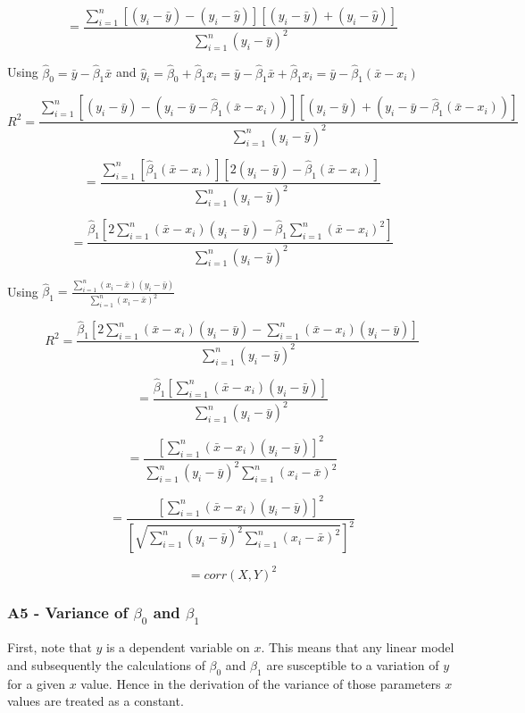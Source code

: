 \documentclass[11pt]{article}
\begin{document}
\[= \frac{ \sum_{i=1}^n [ (y_i - \bar{y}) - (y_i - \hat{y}) ][ (y_i - \bar{y}) + (y_i - \hat{y}) ] }{ \sum_{i=1}^n (y_i - \bar{y})^2 }\]

Using \(\hat{\beta}_0 = \bar{y} - \hat{\beta}_1 \bar{x}\) and
\(\hat{y}_i = \hat{\beta}_0 + \hat{\beta}_1 x_i = \bar{y} - \hat{\beta}_1 \bar{x} + \hat{\beta}_1 x_i = \bar{y} -\hat{\beta}_1(\bar{x} - x_i)\)

\[R^2= \frac{ \sum_{i=1}^n [ (y_i - \bar{y}) - (y_i - \bar{y} -\hat{\beta}_1(\bar{x} - x_i)) ][ (y_i - \bar{y}) + (y_i - \bar{y} -\hat{\beta}_1(\bar{x} - x_i)) ] }{ \sum_{i=1}^n (y_i - \bar{y})^2 }\]

\[= \frac{ \sum_{i=1}^n [ \hat{\beta}_1(\bar{x} - x_i) ][ 2(y_i - \bar{y}) -\hat{\beta}_1(\bar{x} - x_i) ] }{ \sum_{i=1}^n (y_i - \bar{y})^2 }\]

\[= \frac{ \hat{\beta}_1 \left[ 2 \sum_{i=1}^n (\bar{x} - x_i)(y_i - \bar{y}) - \hat{\beta}_1\sum_{i=1}^n (\bar{x} - x_i)^2 \right] }{ \sum_{i=1}^n (y_i - \bar{y})^2 }\]

Using
\(\hat{\beta}_1 = \frac{ \sum_{i=1}^n (x_i - \bar{x})(y_i - \bar{y}) }{ \sum_{i=1}^n (x_i - \bar{x})^2 }\)

\[R^2 = \frac{ \hat{\beta}_1 \left[ 2 \sum_{i=1}^n (\bar{x} - x_i)(y_i - \bar{y}) - \sum_{i=1}^n (\bar{x} - x_i)(y_i - \bar{y}) \right] }{ \sum_{i=1}^n (y_i - \bar{y})^2 }\]

\[= \frac{ \hat{\beta}_1 \left[ \sum_{i=1}^n (\bar{x} - x_i)(y_i - \bar{y}) \right] }{ \sum_{i=1}^n (y_i - \bar{y})^2 }\]

\[= \frac{ \left[ \sum_{i=1}^n (\bar{x} - x_i)(y_i - \bar{y}) \right]^2 }{ \sum_{i=1}^n (y_i - \bar{y})^2 \sum_{i=1}^n (x_i - \bar{x})^2 }\]

\[= \frac{ \left[ \sum_{i=1}^n (\bar{x} - x_i)(y_i - \bar{y}) \right]^2 }{ \left[ \sqrt{ \sum_{i=1}^n (y_i - \bar{y})^2 \sum_{i=1}^n (x_i - \bar{x})^2} \right]^2}\]

\[= corr(X,Y)^2\]

    \hypertarget{a5---variance-of-beta_0-and-beta_1}{%
\subsubsection{\texorpdfstring{A5 - Variance of \(\beta_{0}\) and
\(\beta_{1}\)}{A5 - Variance of \textbackslash{}beta\_\{0\} and \textbackslash{}beta\_\{1\}}}\label{a5---variance-of-beta_0-and-beta_1}}

    First, note that \(y\) is a dependent variable on \(x\). This means that
any linear model and subsequently the calculations of \(\beta_{0}\) and
\(\beta_{1}\) are susceptible to a variation of \(y\) for a given \(x\)
value. Hence in the derivation of the variance of those parameters \(x\)
values are treated as a constant.
\end{document}
